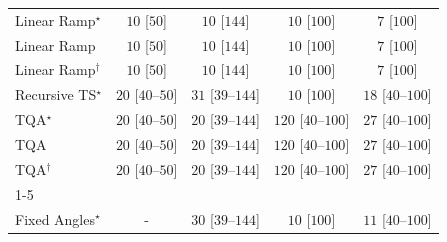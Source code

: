 \begin{tabular}{l|cccc|}
Linear Ramp$^\star$ & {\cellcolor[HTML]{F7FCF5}} \color[HTML]{000000} $10$ [$50$] & {\cellcolor[HTML]{F7FCF5}} \color[HTML]{000000} $10$ [$144$] & {\cellcolor[HTML]{F7FCF5}} \color[HTML]{000000} $10$ [$100$] & {\cellcolor[HTML]{F7FCF5}} \color[HTML]{000000} $7$ [$100$] \\
Linear Ramp & {\cellcolor[HTML]{F7FCF5}} \color[HTML]{000000} $10$ [$50$] & {\cellcolor[HTML]{F7FCF5}} \color[HTML]{000000} $10$ [$144$] & {\cellcolor[HTML]{F7FCF5}} \color[HTML]{000000} $10$ [$100$] & {\cellcolor[HTML]{F7FCF5}} \color[HTML]{000000} $7$ [$100$] \\
Linear Ramp$^\dagger$ & {\cellcolor[HTML]{F7FCF5}} \color[HTML]{000000} $10$ [$50$] & {\cellcolor[HTML]{F7FCF5}} \color[HTML]{000000} $10$ [$144$] & {\cellcolor[HTML]{F7FCF5}} \color[HTML]{000000} $10$ [$100$] & {\cellcolor[HTML]{F7FCF5}} \color[HTML]{000000} $7$ [$100$] \\
Recursive TS$^\star$ & {\cellcolor[HTML]{F5FBF2}} \color[HTML]{000000} $20$ [$40$--$50$] & {\cellcolor[HTML]{F3FAF0}} \color[HTML]{000000} $31$ [$39$--$144$] & {\cellcolor[HTML]{F7FCF5}} \color[HTML]{000000} $10$ [$100$] & {\cellcolor[HTML]{F5FBF3}} \color[HTML]{000000} $18$ [$40$--$100$] \\
TQA$^\star$ & {\cellcolor[HTML]{F5FBF2}} \color[HTML]{000000} $20$ [$40$--$50$] & {\cellcolor[HTML]{F5FBF2}} \color[HTML]{000000} $20$ [$39$--$144$] & {\cellcolor[HTML]{E0F3DB}} \color[HTML]{000000} $120$ [$40$--$100$] & {\cellcolor[HTML]{F4FBF1}} \color[HTML]{000000} $27$ [$40$--$100$] \\
TQA & {\cellcolor[HTML]{F5FBF2}} \color[HTML]{000000} $20$ [$40$--$50$] & {\cellcolor[HTML]{F5FBF2}} \color[HTML]{000000} $20$ [$39$--$144$] & {\cellcolor[HTML]{E0F3DB}} \color[HTML]{000000} $120$ [$40$--$100$] & {\cellcolor[HTML]{F4FBF1}} \color[HTML]{000000} $27$ [$40$--$100$] \\
TQA$^\dagger$ & {\cellcolor[HTML]{F5FBF2}} \color[HTML]{000000} $20$ [$40$--$50$] & {\cellcolor[HTML]{F5FBF2}} \color[HTML]{000000} $20$ [$39$--$144$] & {\cellcolor[HTML]{E0F3DB}} \color[HTML]{000000} $120$ [$40$--$100$] & {\cellcolor[HTML]{F4FBF1}} \color[HTML]{000000} $27$ [$40$--$100$] \\
\cline{1-5}
\multicolumn{5}{c}{\rule{0pt}{8pt}PP} \\
\midrule
Fixed Angles$^\star$ & {\cellcolor[HTML]{000000}} \color[HTML]{F1F1F1} {\cellcolor{white}} \color{black} - & {\cellcolor[HTML]{F3FAF0}} \color[HTML]{000000} $30$ [$39$--$144$] & {\cellcolor[HTML]{F7FCF5}} \color[HTML]{000000} $10$ [$100$] & {\cellcolor[HTML]{F6FCF4}} \color[HTML]{000000} $11$ [$40$--$100$] \\

\end{tabular}
